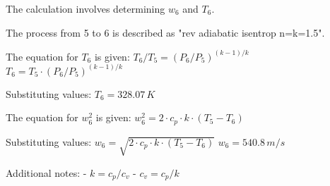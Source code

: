 The calculation involves determining \( w_6 \) and \( T_6 \).  

The process from 5 to 6 is described as "rev adiabatic isentrop n=k=1.5".  

The equation for \( T_6 \) is given:  
\( T_6 / T_5 = (P_6 / P_5)^{(k-1)/k} \)  
\( T_6 = T_5 \cdot (P_6 / P_5)^{(k-1)/k} \)  

Substituting values:  
\( T_6 = 328.07 \, K \)  

The equation for \( w_6^2 \) is given:  
\( w_6^2 = 2 \cdot c_p \cdot k \cdot (T_5 - T_6) \)  

Substituting values:  
\( w_6 = \sqrt{2 \cdot c_p \cdot k \cdot (T_5 - T_6)} \)  
\( w_6 = 540.8 \, m/s \)  

Additional notes:  
- \( k = c_p / c_v \)  
- \( c_v = c_p / k \)